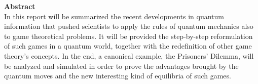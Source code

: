 \hfill

\textbf{Abstract}\\
In this report will be summarized the recent developments in quantum information that pushed scientists to apply the rules of quantum mechanics also to game theoretical problems. It will be provided the step-by-step reformulation of such games in a quantum world, together with the redefinition of other game theory's concepts. In the end, a canonical example, the Prisoners' Dilemma, will be analyzed and simulated in order to prove the advantages brought by the quantum moves and the new interesting kind of equilibria of such games.\\
